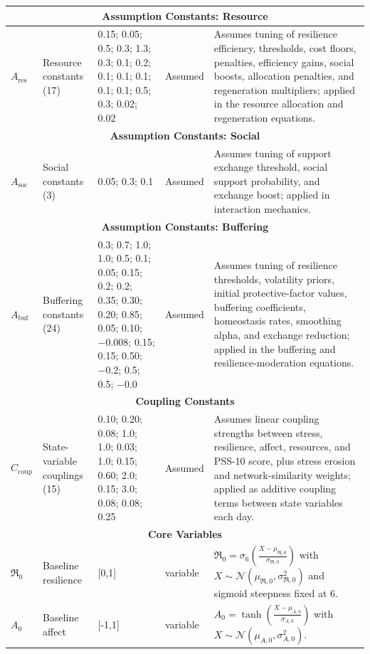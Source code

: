 \documentclass[
  letterpaper,
  DIV=11,
  numbers=noendperiod]{scrartcl}
\begin{document}
\begin{longtable}{lp{2.4cm}p{1.6cm}p{1.7cm}p{5.2cm}}
\midrule
\multicolumn{5}{c}{\textbf{Assumption Constants: Resource}} \\
\midrule
$A_{\mathrm{res}}$ & Resource constants (17) & 0.15; 0.05; 0.5; 0.3; 1.3; 0.3; 0.1; 0.2; 0.1; 0.1; 0.1; 0.1; 0.1; 0.5; 0.3; 0.02; 0.02 & Assumed & Assumes tuning of resilience efficiency, thresholds, cost floors, penalties, efficiency gains, social boosts, allocation penalties, and regeneration multipliers; applied in the resource allocation and regeneration equations. \\
\midrule
\multicolumn{5}{c}{\textbf{Assumption Constants: Social}} \\
\midrule
$A_{\mathrm{soc}}$ & Social constants (3) & 0.05; 0.3; 0.1 & Assumed & Assumes tuning of support exchange threshold, social support probability, and exchange boost; applied in interaction mechanics. \\
\midrule
\multicolumn{5}{c}{\textbf{Assumption Constants: Buffering}} \\
\midrule
$A_{\mathrm{buf}}$ & Buffering constants (24) & 0.3; 0.7; 1.0; 1.0; 0.5; 0.1; 0.05; 0.15; 0.2; 0.2; 0.35; 0.30; 0.20; 0.85; 0.05; 0.10; $-0.008$; 0.15; 0.15; 0.50; $-0.2$; 0.5; 0.5; $-0.0$ & Assumed & Assumes tuning of resilience thresholds, volatility priors, initial protective-factor values, buffering coefficients, homeostasis rates, smoothing alpha, and exchange reduction; applied in the buffering and resilience-moderation equations. \\
\midrule
\multicolumn{5}{c}{\textbf{Coupling Constants}} \\
\midrule
$C_{\mathrm{coup}}$ & State-variable couplings (15) & 0.10; 0.20; 0.08; 1.0; 1.0; 0.03; 1.0; 0.15; 0.60; 2.0; 0.15; 3.0; 0.08; 0.08; 0.25 & Assumed & Assumes linear coupling strengths between stress, resilience, affect, resources, and PSS-10 score, plus stress erosion and network-similarity weights; applied as additive coupling terms between state variables each day. \\
\midrule
\multicolumn{5}{c}{\textbf{Core Variables}} \\
\midrule
$\mathfrak{R}_0$ & Baseline resilience & [0,1] & variable & $\mathfrak{R}_0 = \sigma_6\left(\frac{X - \mu_{\mathfrak{R},0}}{\sigma_{\mathfrak{R},0}}\right)$ with $X \sim \mathcal{N}(\mu_{\mathfrak{R},0},\sigma_{\mathfrak{R},0}^2)$ and sigmoid steepness fixed at 6. \\
$A_0$ & Baseline affect & [-1,1] & variable & $A_0 = \tanh\left(\frac{X - \mu_{A,0}}{\sigma_{A,0}}\right)$ with $X \sim \mathcal{N}(\mu_{A,0},\sigma_{A,0}^2)$. \\

\end{longtable}
\end{document}
